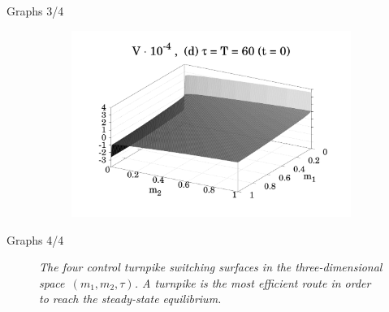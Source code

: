\documentclass{beamer}
\begin{document}
\begin{frame}{Graphs 3/4}
\begin{figure}
\begin{subfigure}{.48 \textwidth}
            \label{fig_4_c}
        \end{subfigure}
        \begin{subfigure}{.48 \textwidth}
            \includegraphics[width = \textwidth]{figures/Figure_4d_1.pdf}
            \label{fig_4_d}
        \end{subfigure}
    \label{Fig_4}
    \end{figure}
\end{frame}

\begin{frame}{Graphs 4/4}
    \begin{figure}
        \bf \caption{\it The four control turnpike switching surfaces in the three-dimensional space~$ (m_1, m_2, \tau) $. A turnpike is the most efficient route in order to reach the steady-state equilibrium.}
        \label{Fig_7}
    \end{figure}
\end{frame}
\end{document}
